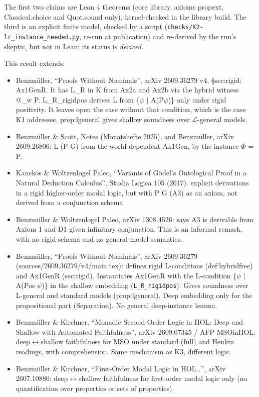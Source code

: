 \documentclass{article}
\begin{document}
The first two claims are Lean 4 theorems (core library, axioms propext, Classical.choice and
Quot.sound only), kernel-checked in the library build. The third is an explicit finite model,
checked by a script (\texttt{checks/K2-lr\_instance\_needed.py}, re-run at publication) and re-derived by
the run's skeptic, but not in Lean; its status is \emph{derived}.

This result extends:

\begin{itemize}
\item Benzmüller, ``Proofs Without Nominals'', arXiv 2609.36279 v4, \S{}sec:rigid: Ax1GenR. It has L\_R in K from Ax2a and Ax2b via the hybrid witness @\_w P. L\_R\_rigidpos derives L from \{$\psi$ $\mid$ A(P$\psi$)\} only under rigid positivity. It leaves open the case without that condition, which is the case K1 addresses. prop:lgeneral gives shallow soundness over $\mathcal{L}$-general models.
\item Benzmüller \& Scott, Notes (Monatshefte 2025), and Benzmüller, arXiv 2609.26806: L (P G) from the world-dependent Ax1Gen, by the instance $\Phi$ = P.
\item Kanckos \& Woltzenlogel Paleo, ``Variants of Gödel's Ontological Proof in a Natural Deduction Calculus'', Studia Logica 105 (2017): explicit derivations in a rigid higher-order modal logic, but with P G (A3) as an axiom, not derived from a conjunction schema.
\item Benzmüller \& Woltzenlogel Paleo, arXiv 1308.4526: says A3 is derivable from Axiom 1 and D1 given infinitary conjunction. This is an informal remark, with no rigid schema and no general-model semantics.
\item Benzmüller, ``Proofs Without Nominals'', arXiv 2609.36279 (sources/2609.36279/v4/main.tex): defines rigid L-conditions (def:hybridfree) and Ax1GenR (sec:rigid). Instantiates Ax1GenR with the L-condition \{$\psi$ $\mid$ A(Pos $\psi$)\} in the shallow embedding (\texttt{L\_R\_rigidpos}). Gives soundness over L-general and standard models (prop:lgeneral). Deep embedding only for the propositional part (Separation). No general deep-instance lemma.
\item Benzmüller \& Kirchner, ``Monadic Second-Order Logic in HOL: Deep and Shallow with Automated Faithfulness'', arXiv 2609.07345 / AFP MSOinHOL: deep$\leftrightarrow$shallow faithfulness for MSO under standard (full) and Henkin readings, with comprehension. Same mechanism as K3, different logic.
\item Benzmüller \& Kirchner, ``First-Order Modal Logic in HOL\ldots{}'', arXiv 2607.10880: deep$\leftrightarrow$shallow faithfulness for first-order modal logic only (no quantification over properties or sets of properties).

\end{itemize}
\end{document}

